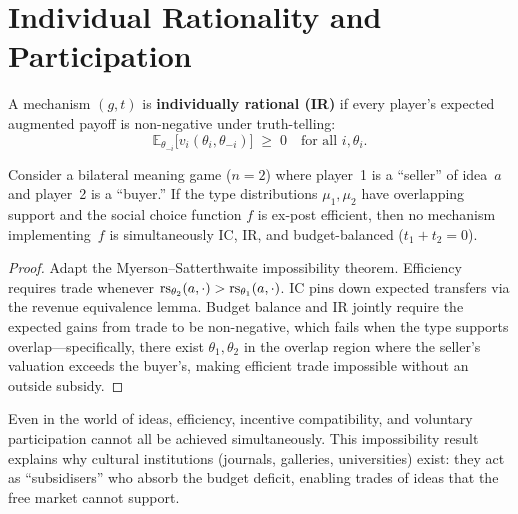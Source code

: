 \section{Individual Rationality and Participation}
\label{sec:ir}

\begin{definition}
\label{def:ir}
A mechanism $(g, t)$ is \textbf{individually rational (IR)} if
every player's expected augmented payoff is non-negative under
truth-telling:
\[
  \mathbb{E}_{\theta_{-i}}\bigl[v_i(\theta_i,\theta_{-i})\bigr]
  \;\ge\; 0
  \quad\text{for all } i, \theta_i.
\]
\end{definition}

\begin{theorem}
\label{thm:myerson-impossibility}
Consider a bilateral meaning game ($n=2$) where player~1 is a
``seller'' of idea~$a$ and player~2 is a ``buyer.''  If the type
distributions $\mu_1, \mu_2$ have overlapping support and the
social choice function $f$ is ex-post efficient, then no
mechanism implementing~$f$ is simultaneously IC, IR, and
budget-balanced ($t_1 + t_2 = 0$).
\end{theorem}

\begin{proof}
Adapt the Myerson--Satterthwaite impossibility theorem.
Efficiency requires trade whenever $\mathrm{rs}_{\theta_2}(a,\cdot) >
\mathrm{rs}_{\theta_1}(a,\cdot)$.  IC pins down expected transfers via
the revenue equivalence lemma.  Budget balance and IR jointly
require the expected gains from trade to be non-negative, which
fails when the type supports overlap---specifically, there exist
$\theta_1, \theta_2$ in the overlap region where the seller's
valuation exceeds the buyer's, making efficient trade impossible
without an outside subsidy.
\end{proof}

\begin{interpretation}
Even in the world of ideas, efficiency, incentive compatibility,
and voluntary participation cannot all be achieved simultaneously.
This impossibility result explains why cultural institutions
(journals, galleries, universities) exist: they act as
``subsidisers'' who absorb the budget deficit, enabling trades
of ideas that the free market cannot support.
\end{interpretation}

